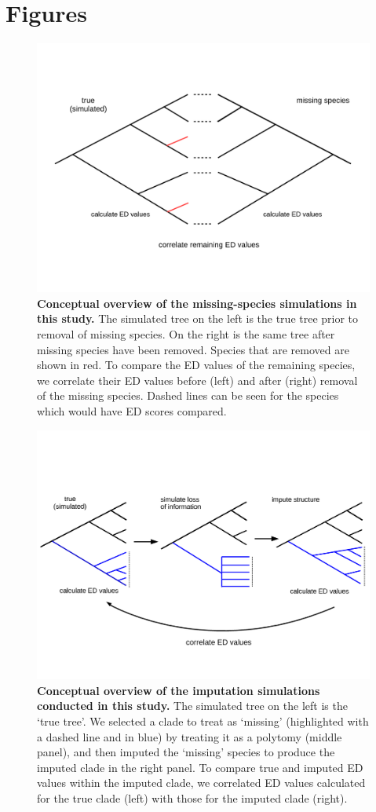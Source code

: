 \documentclass[10pt,english]{article}
\begin{document}
\section*{Figures}

\begin{figure}[!ht]
  \center
  \includegraphics[width=.75\textwidth]{missingSpecies.png}
  \caption{\textbf{Conceptual overview of the missing-species simulations in
  this study.} The simulated tree on the left is the true tree prior to removal
  of missing species. On the right is the same tree after missing species have
  been removed. Species that are removed are shown in red. To compare the ED
  values of the remaining species, we correlate their ED values before (left)
  and after (right) removal of the missing species. Dashed lines can be seen for
  the species which would have ED scores compared.}
  \label{missingSpecies}
\end{figure}

\begin{figure}[!ht]
  \center
  \includegraphics[width=.75\textwidth]{imputeConcept.png}
  \caption{\textbf{Conceptual overview of the imputation simulations conducted
  in this study.} The simulated tree on the left is the ‘true tree'. We selected
  a clade to treat as ‘missing' (highlighted with a dashed line and in blue) by
  treating it as a polytomy (middle panel), and then imputed the ‘missing'
  species to produce the imputed clade in the right panel. To compare true and
  imputed ED values within the imputed clade, we correlated ED values calculated
  for the true clade (left) with those for the imputed clade (right).}
  \label{imputeConcept}
\end{figure}
\end{document}
